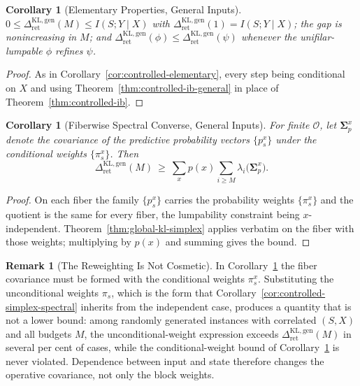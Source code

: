 \documentclass[12pt]{article}
\newtheorem{corollary}[theorem]{Corollary}
\theoremstyle{definition}
\newtheorem{remark}[theorem]{Remark}
\newcommand{\RetKLg}{\Delta_{\mathrm{ret}}^{\mathrm{KL,gen}}}
\begin{document}
\begin{corollary}[Elementary Properties, General Inputs]
\label{cor:controlled-elementary-general}
$0\le\RetKLg(M)\le I(S;Y\mid X)$ with $\RetKLg(1)=I(S;Y\mid X)$; the gap is
nonincreasing in $M$; and $\RetKLg(\phi)\le\RetKLg(\psi)$ whenever the
unifilar-lumpable $\phi$ refines $\psi$.
\end{corollary}

\begin{proof}
As in Corollary~\ref{cor:controlled-elementary}, every step being conditional
on $X$ and using Theorem~\ref{thm:controlled-ib-general} in place of
Theorem~\ref{thm:controlled-ib}.
\end{proof}

\begin{corollary}[Fiberwise Spectral Converse, General Inputs]
\label{cor:controlled-simplex-general}
For finite $\mathcal O$, let $\bm{\Sigma}_p^{x}$ denote the covariance of the
predictive probability vectors $\{p_s^x\}$ under the \emph{conditional} weights
$\{\pi_s^x\}$.  Then
\[
\RetKLg(M)
\ \ge\
\sum_xp(x)\sum_{i\ge M}\lambda_i\bigl(\bm{\Sigma}_p^{x}\bigr).
\]
\end{corollary}

\begin{proof}
On each fiber the family $\{p_s^x\}$ carries the probability weights
$\{\pi_s^x\}$ and the quotient is the same for every fiber, the lumpability
constraint being $x$-independent.  Theorem~\ref{thm:global-kl-simplex} applies
verbatim on the fiber with those weights; multiplying by $p(x)$ and summing
gives the bound.
\end{proof}

\begin{remark}[The Reweighting Is Not Cosmetic]
\label{rem:controlled-general-reweighting}
In Corollary~\ref{cor:controlled-simplex-general} the fiber covariance must be
formed with the conditional weights $\pi_s^x$.  Substituting the unconditional
weights $\pi_s$, which is the form that Corollary~\ref{cor:controlled-simplex-spectral}
inherits from the independent case, produces a quantity that is not a lower
bound: among randomly generated instances with correlated $(S,X)$ and all
budgets $M$, the unconditional-weight expression exceeds $\RetKLg(M)$ in
several per cent of cases, while the conditional-weight bound of
Corollary~\ref{cor:controlled-simplex-general} is never violated.  Dependence
between input and state therefore changes the operative covariance, not only
the block weights.
\end{remark}
\end{document}
